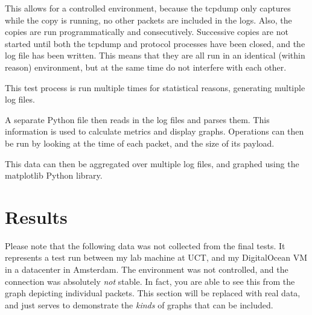 \documentclass{sig-alternate-05-2015}
\begin{document}
This allows for a controlled environment, because the tcpdump only captures while the copy is running, no other packets are included in the logs. Also, the copies are run programmatically and consecutively. Successive copies are not started until both the tcpdump and protocol processes have been closed, and the log file has been written. This means that they are all run in an identical (within reason) environment, but at the same time do not interfere with each other.

This test process is run multiple times for statistical reasons, generating multiple log files.

A separate Python file then reads in the log files and parses them. This information is used to calculate metrics and display graphs.
Operations can then be run by looking at the time of each packet, and the size of its payload. 

This data can then be aggregated over multiple log files, and graphed using the matplotlib Python library.

\section{Results}
Please note that the following data was not collected from the final tests. It represents a test run between my lab machine at UCT, and my DigitalOcean VM in a datacenter in Amsterdam. The environment was not controlled, and the connection was absolutely \textit{not} stable. In fact, you are able to see this from the graph depicting individual packets. This section will be replaced with real data, and just serves to demonstrate the \textit{kinds} of graphs that can be included. 
\end{document}
